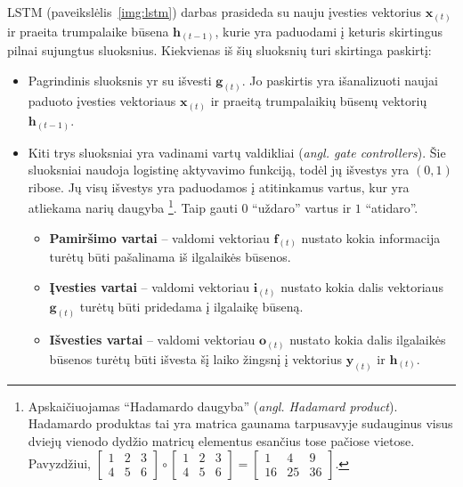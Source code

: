 \documentclass{VUMIFPSbakalaurinis}
\begin{document}
{	LSTM (paveikslėlis~\ref{img:lstm}) darbas prasideda su nauju įvesties vektorius \(\mathbf{x}_{(t)}\) ir praeita trumpalaike būsena \(\mathbf{h}_{(t-1)}\), kurie yra paduodami į keturis skirtingus pilnai sujungtus sluoksnius. Kiekvienas iš šių sluoksnių turi skirtinga paskirtį:
	
	\begin{itemize}
		\item Pagrindinis sluoksnis yr su išvesti \(\mathbf{g}_{(t)}\). Jo paskirtis yra išanalizuoti naujai paduoto įvesties vektoriaus \(\mathbf{x}_{(t)}\) ir praeitą trumpalaikių būsenų vektorių \(\mathbf{h}_{(t-1)}\).
		\item Kiti trys sluoksniai yra vadinami vartų valdikliai (\textit{angl. gate controllers}). Šie sluoksniai naudoja logistinę aktyvavimo funkciją, todėl jų išvestys yra \((0, 1)\) ribose. Jų visų išvestys yra paduodamos į atitinkamus vartus, kur yra atliekama narių daugyba
		\footnote{Apskaičiuojamas \enquote{Hadamardo daugyba} (\textit{angl. Hadamard product}). Hadamardo produktas tai yra matrica gaunama tarpusavyje sudauginus visus dviejų vienodo dydžio matricų elementus esančius tose pačiose vietose. Pavyzdžiui, 
			\(\begin{bmatrix} 1 & 2 & 3 \\ 4 & 5 & 6 \end{bmatrix} \circ
			\begin{bmatrix} 1 & 2 & 3 \\ 4 & 5 & 6 \end{bmatrix} =			
			\begin{bmatrix} 1 & 4 & 9 \\ 16 & 25 & 36 \end{bmatrix}\).
		}. Taip gauti \(0\) \enquote{uždaro} vartus ir \(1\) \enquote{atidaro}.
		\begin{itemize}
			\item \textbf{Pamiršimo vartai} -- valdomi vektoriau \(\mathbf{f}_{(t)}\) nustato kokia informacija turėtų būti pašalinama iš ilgalaikės būsenos.
			\item \textbf{Įvesties vartai} -- valdomi vektoriau \(\mathbf{i}_{(t)}\) nustato kokia dalis vektoriaus \(\mathbf{g}_{(t)}\) turėtų būti pridedama į ilgalaikę būseną.
			\item \textbf{Išvesties vartai} -- valdomi vektoriau \(\mathbf{o}_{(t)}\) nustato kokia dalis ilgalaikės būsenos turėtų būti išvesta šį laiko žingsnį į vektorius \(\mathbf{y}_{(t)}\) ir \(\mathbf{h}_{(t)}\).
		\end{itemize}
	\end{itemize}
}
\end{document}
